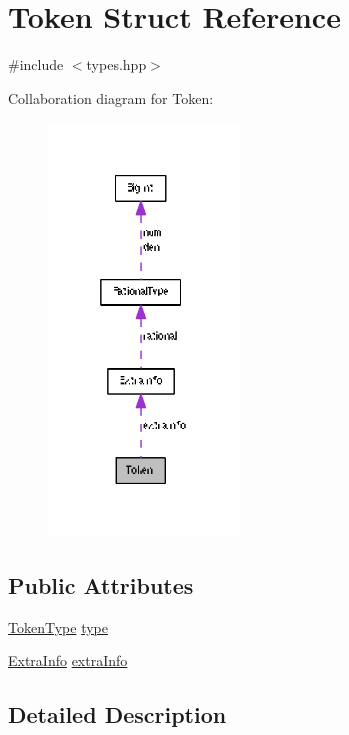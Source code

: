 \hypertarget{struct_token}{}\section{Token Struct Reference}
\label{struct_token}


{\ttfamily \#include $<$types.\+hpp$>$}



Collaboration diagram for Token\+:
\nopagebreak
\begin{figure}[H]
\begin{center}
\leavevmode
\includegraphics[width=145pt]{struct_token__coll__graph}
\end{center}
\end{figure}
\subsection*{Public Attributes}
\begin{DoxyCompactItemize}
\item 
\hyperlink{all_8hpp_aa520fbf142ba1e7e659590c07da31921}{Token\+Type} \hyperlink{struct_token_a67919af9f3a80dc0b28a0ab1e6d5bf8a}{type}
\item 
\hyperlink{union_extra_info}{Extra\+Info} \hyperlink{struct_token_a4f87d42e49694469c8a97080e4831370}{extra\+Info}
\end{DoxyCompactItemize}


\subsection{Detailed Description}


